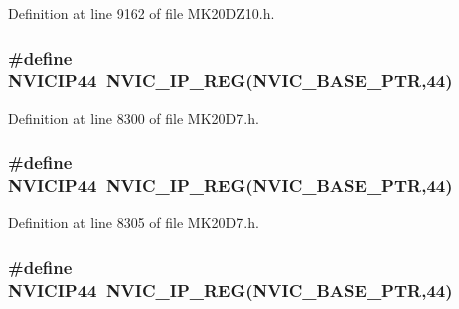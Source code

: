 Definition at line 9162 of file M\+K20\+D\+Z10.\+h.

\subsubsection[{\texorpdfstring{N\+V\+I\+C\+I\+P44}{NVICIP44}}]{\setlength{\rightskip}{0pt plus 5cm}\#define N\+V\+I\+C\+I\+P44~{\bf N\+V\+I\+C\+\_\+\+I\+P\+\_\+\+R\+EG}({\bf N\+V\+I\+C\+\_\+\+B\+A\+S\+E\+\_\+\+P\+TR},44)}\hypertarget{group___n_v_i_c___register___accessor___macros_ga9268379eaca0a2de96c2da71d1f4e606}{}\label{group___n_v_i_c___register___accessor___macros_ga9268379eaca0a2de96c2da71d1f4e606}


Definition at line 8300 of file M\+K20\+D7.\+h.

\subsubsection[{\texorpdfstring{N\+V\+I\+C\+I\+P44}{NVICIP44}}]{\setlength{\rightskip}{0pt plus 5cm}\#define N\+V\+I\+C\+I\+P44~{\bf N\+V\+I\+C\+\_\+\+I\+P\+\_\+\+R\+EG}({\bf N\+V\+I\+C\+\_\+\+B\+A\+S\+E\+\_\+\+P\+TR},44)}\hypertarget{group___n_v_i_c___register___accessor___macros_ga9268379eaca0a2de96c2da71d1f4e606}{}\label{group___n_v_i_c___register___accessor___macros_ga9268379eaca0a2de96c2da71d1f4e606}


Definition at line 8305 of file M\+K20\+D7.\+h.

\subsubsection[{\texorpdfstring{N\+V\+I\+C\+I\+P44}{NVICIP44}}]{\setlength{\rightskip}{0pt plus 5cm}\#define N\+V\+I\+C\+I\+P44~{\bf N\+V\+I\+C\+\_\+\+I\+P\+\_\+\+R\+EG}({\bf N\+V\+I\+C\+\_\+\+B\+A\+S\+E\+\_\+\+P\+TR},44)}\hypertarget{group___n_v_i_c___register___accessor___macros_ga9268379eaca0a2de96c2da71d1f4e606}{}\label{group___n_v_i_c___register___accessor___macros_ga9268379eaca0a2de96c2da71d1f4e606}


